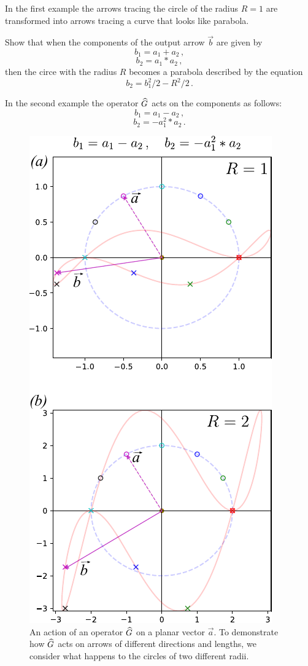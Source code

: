 In the first example the arrows tracing the circle of the radius
$R=1$ are transformed into arrows tracing a curve that looks like
parabola.
\begin{exercise}\label{exe:CircleToParabola}
Show that when the components of the output arrow $\vec{b}$ are given
by
\[
b_1 = a_1 + a_2\,,
\]
\[
b_2 = a_1 * a_2\,,
\]
then the circe with the radius $R$ becomes a parabola described by the
equation
\[
b_2 = b^2_1/2 - R^2/2\,.
\]
\end{exercise}

In the second example the operator $\widehat{G}$ acts on the components as follows:
\[
b_1 = a_1 - a_2\,,
\]
\[
b_2 = -a^2_1 * a_2\,.
\]
\begin{figure}[htbp]
  \centering
  \includegraphics[scale=1.0]{operatorAction_v2}
  \caption{An action of an operator $\widehat{G}$ on a planar vector
    $\vec{a}$. To demonstrate how $\widehat{G}$ acts on arrows of different
  directions and lengths, we consider what happens to the circles of
  two different radii.}
  \label{fig:operatorActionV2}
\end{figure}
